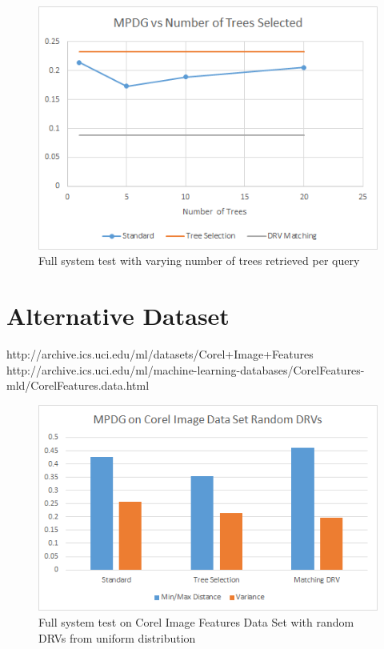 \begin{figure}[h]
\begin{center}
\includegraphics[width=.85\textwidth]{Figures/treesel}
\end{center}
\caption{Full system test with varying number of trees retrieved per query}
\label{fig:treesel}
\end{figure}

\section{Alternative Dataset}

http://archive.ics.uci.edu/ml/datasets/Corel+Image+Features
http://archive.ics.uci.edu/ml/machine-learning-databases/CorelFeatures-mld/CorelFeatures.data.html
\begin{figure}[h]
\begin{center}
\includegraphics[width=.85\textwidth]{Figures/altrand}
\end{center}
\caption{Full system test on Corel Image Features Data Set with random DRVs from uniform distribution}
\label{fig:altrand}
\end{figure}

